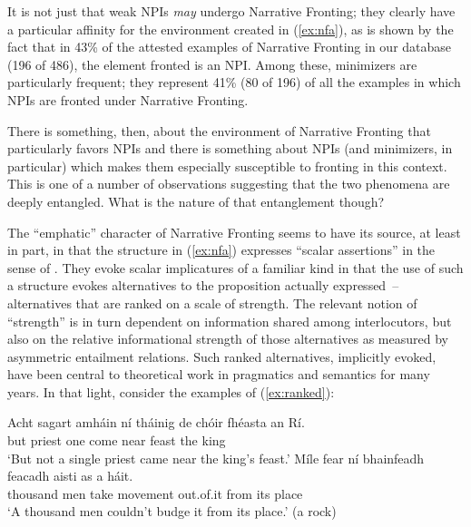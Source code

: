 \documentclass[output=paper,colorlinks,citecolor=brown]{langscibook}
\begin{document}
\noindent It is not just that weak NPIs {\itshape may} undergo Narrative Fronting; they clearly have a particular affinity for the environment created in (\ref{ex:nfa}), as is shown by the fact that in 43\% of the attested examples of Narrative Fronting in our database (196 of 486), the element fronted is an NPI. Among these, minimizers are particularly frequent; they represent 41\% (80 of 196) of all the examples in which NPIs are fronted under Narrative Fronting.

There is something, then, about the environment of Narrative Fronting that particularly favors NPIs and there is something about NPIs (and minimizers, in particular) which makes them especially susceptible to fronting in this context.  This is one of a number of observations suggesting that the two phenomena are deeply entangled.  What is the nature of that entanglement though?

The “emphatic” character of Narrative Fronting seems to have its source, at least in part, in that the structure in (\ref{ex:nfa}) expresses “scalar assertions” in the sense of \citet{krifka:95}.  They evoke scalar implicatures of a familiar kind in that the use of such a structure evokes alternatives to the proposition actually expressed~-- alternatives that are ranked on a scale of strength. The relevant notion of “strength” is in turn dependent on information shared among interlocutors, but also on the relative informational strength of those alternatives as measured by asymmetric entailment relations.  Such ranked alternatives, implicitly evoked, have been central to theoretical work in pragmatics and semantics for many years.  In that light, consider the examples of (\ref{ex:ranked}):


\ea\label{ex:ranked}
\ea
\gll Acht sagart amháin ní tháinig {de chóir} fhéasta an Rí. \\
     but priest one {\no} {come\past} near  feast the king \\
\glt `But not a single priest came near the king's feast.'\label{ex:ri}
\ex
\gll Míle fear ní bhainfeadh feacadh aisti as a háit. \\
     thousand men {\no} {take\cond} movement out.of.it from its place \\
\glt `A thousand men couldn't budge it from its place.' (a rock)
\z
\z
\end{document}
